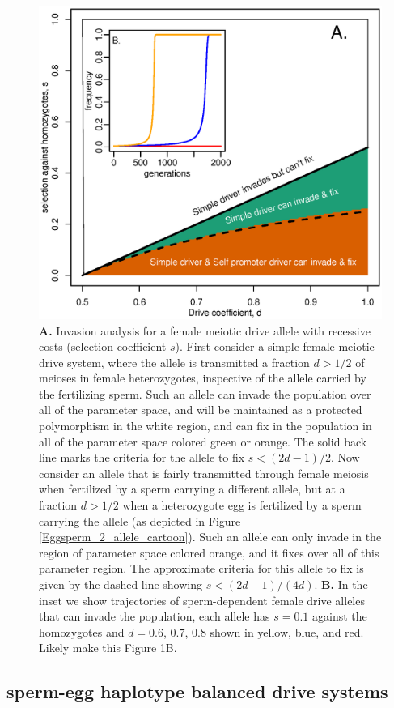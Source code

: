 \documentclass[12pt,letterpaper]{article}
\newcommand{\gc}[1]{{ \color{red} #1}}
\begin{document}
\begin{figure}
\includegraphics[width = 0.8 \textwidth]{Figures/invasion_space_recessive_driver.eps}
\caption{{\bf A.} Invasion analysis for a female meiotic drive allele with
  recessive costs (selection coefficient $s$). First consider a simple female meiotic
  drive system, where the allele is transmitted a fraction $d>1/2$ of
  meioses in female heterozygotes, inspective
  of the allele carried by the fertilizing sperm. 
Such an allele can invade the population over all of the parameter space, and will be maintained as a
  protected polymorphism in the white region, and can fix in the
  population in all of the parameter space colored green or orange. 
The solid back line marks the criteria for the allele to fix $s< (2d-1)/2$.
Now consider an allele that is fairly transmitted through
  female meiosis when fertilized by a sperm carrying a different
  allele, but at a fraction $d>1/2$ when a heterozygote egg is fertilized
  by a sperm carrying the allele (as depicted in Figure
  \ref{Eggsperm_2_allele_cartoon}). Such an allele can only invade in
  the region of parameter space colored orange, and it fixes over all
  of this parameter region. The approximate criteria for this allele
  to fix is given by the dashed line showing $s < (2d- 1)/(4d)$. 
 {\bf B.} In the inset we show trajectories of sperm-dependent female drive
 alleles that can invade the population, each allele has $s =0.1$ against the
 homozygotes and $d =0.6$, $0.7$, $0.8$ shown in yellow, blue, and red. 
 \gc{Likely make this Figure 1B.} } \label{Invasion_space}
\end{figure}


\subsection*{ sperm-egg haplotype balanced drive systems}
\end{document}
